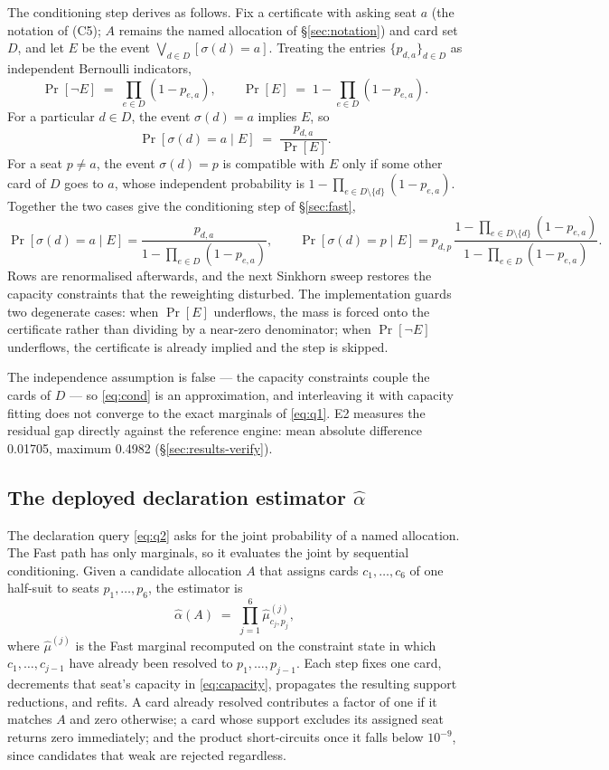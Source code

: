 \documentclass[11pt]{article}
\theoremstyle{definition}
\newcommand{\numSinkhornMean}{0.01705}
\newcommand{\numSinkhornMax}{0.4982}
\begin{document}
The conditioning step derives as follows. Fix a certificate with asking seat $a$
(the notation of (C5); $A$ remains the named allocation of \S\ref{sec:notation})
and card set $D$, and let $E$ be the event $\bigvee_{d\in D}[\sigma(d)=a]$.
Treating the entries $\{p_{d,a}\}_{d \in D}$ as independent Bernoulli indicators,
\[
  \Pr[\neg E] \;=\; \prod_{e \in D} (1 - p_{e,a}),
  \qquad
  \Pr[E] \;=\; 1 - \prod_{e \in D} (1 - p_{e,a}) .
\]
For a particular $d \in D$, the event $\sigma(d) = a$ implies $E$, so
\[
  \Pr[\sigma(d) = a \mid E] \;=\; \frac{p_{d,a}}{\Pr[E]} .
\]
For a seat $p \ne a$, the event $\sigma(d) = p$ is compatible with $E$ only if
some other card of $D$ goes to $a$, whose independent probability is
$1 - \prod_{e \in D\setminus\{d\}}(1 - p_{e,a})$. Together the two cases give the
conditioning step of \S\ref{sec:fast},
\begin{equation}
  \Pr[\sigma(d) = a \mid E] = \frac{p_{d,a}}{1 - \prod_{e \in D}(1 - p_{e,a})},
  \qquad
  \Pr[\sigma(d) = p \mid E] = p_{d,p}\,
    \frac{1 - \prod_{e \in D \setminus \{d\}}(1 - p_{e,a})}{1 - \prod_{e \in D}(1 - p_{e,a})}.
  \label{eq:cond}
\end{equation}
Rows are renormalised afterwards, and
the next Sinkhorn sweep restores the capacity constraints that the reweighting
disturbed. The implementation guards two degenerate cases: when $\Pr[E]$
underflows, the mass is forced onto the certificate rather than dividing by a
near-zero denominator; when $\Pr[\neg E]$ underflows, the certificate is already
implied and the step is skipped.

The independence assumption is false --- the capacity constraints couple the
cards of $D$ --- so \eqref{eq:cond} is an approximation, and interleaving it with
capacity fitting does not converge to the exact marginals of
\eqref{eq:q1}. E2 measures the residual gap directly against the reference
engine: mean absolute difference \numSinkhornMean{}, maximum \numSinkhornMax{}
(\S\ref{sec:results-verify}).

\subsection{The deployed declaration estimator $\hat\alpha$}
\label{app:alpha}

The declaration query \eqref{eq:q2} asks for the joint probability of a named
allocation. The Fast path has only marginals, so it evaluates the joint by
sequential conditioning. Given a candidate allocation $A$ that assigns cards
$c_1,\dots,c_6$ of one half-suit to seats $p_1,\dots,p_6$, the estimator is
\[
  \hat\alpha(A) \;=\; \prod_{j=1}^{6} \hat\mu^{(j)}_{c_j, p_j},
\]
where $\hat\mu^{(j)}$ is the Fast marginal recomputed on the constraint state in
which $c_1,\dots,c_{j-1}$ have already been resolved to $p_1,\dots,p_{j-1}$. Each
step fixes one card, decrements that seat's capacity in \eqref{eq:capacity},
propagates the resulting support reductions, and refits. A card already resolved
contributes a factor of one if it matches $A$ and zero otherwise; a card whose
support excludes its assigned seat returns zero immediately; and the product
short-circuits once it falls below $10^{-9}$, since candidates that weak are
rejected regardless.
\end{document}
